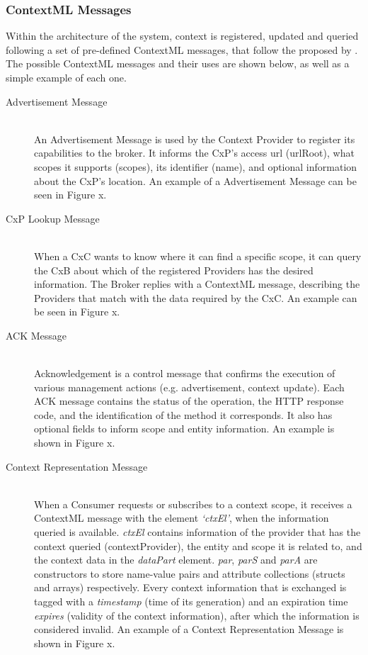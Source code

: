 \subsubsection{ContextML Messages}
Within the architecture of the system, context is registered, updated and queried following a set of pre-defined ContextML messages, that follow the proposed by \cite{knappmeyer2010contextml}. The possible ContextML messages and their uses are shown below, as well as a simple example of each one.

\begin{description}
\item[Advertisement Message]\hfill \\
An Advertisement Message is used by the Context Provider to register its capabilities to the broker. It informs the CxP’s access url (urlRoot), what scopes it supports (scopes), its identifier (name), and optional information about the CxP’s location. An example of a Advertisement Message can be seen in Figure x. 

\item[CxP Lookup Message]\hfill \\
When a CxC wants to know where it can find a specific scope, it can query the CxB about which of the registered Providers has the desired information. The Broker replies with a ContextML message, describing the Providers that match with the data required by the CxC. An example can be seen in Figure x.

\item[ACK Message]\hfill \\
Acknowledgement is a control message that confirms the execution of various management actions (e.g. advertisement, context update). Each ACK message contains the status of the operation, the HTTP response code, and the identification of the method it corresponds. It also has optional fields to inform scope and entity information. An example is shown in Figure x.


\item[Context Representation Message]\hfill \\
When a Consumer requests or subscribes to a context scope, it receives a ContextML message with the element \textit{‘ctxEl’}, when the information queried is available. \textit{ctxEl} contains information of the provider that has the context queried (contextProvider), the entity and scope it is related to, and the context data in the \textit{dataPart} element. \textit{par}, \textit{parS} and \textit{parA} are constructors to store name-value pairs and attribute collections (structs and arrays) respectively. Every context information that is exchanged is tagged with a \textit{timestamp} (time of its generation) and an expiration time \textit{expires} (validity of the context information), after which the information is considered invalid. An example of a Context Representation Message is shown in Figure x.

\end{description}



